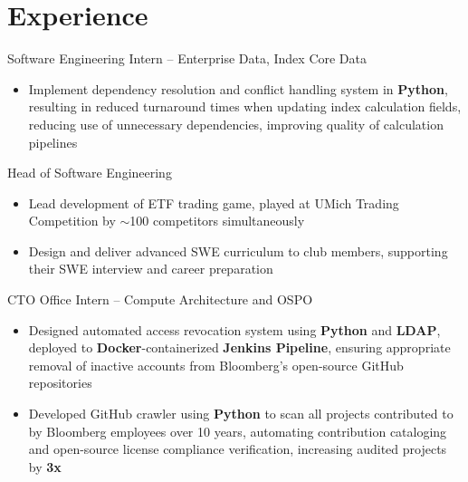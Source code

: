 \documentclass[letterpaper,11pt]{article}
\begin{document}
\section{Experience}
{Software Engineering Intern -- Enterprise Data, Index Core Data}{}
\begin{itemize}
    \item Implement dependency resolution and conflict handling system in
        \textbf{Python}, resulting in reduced turnaround times when
        updating index calculation fields, reducing use of unnecessary
        dependencies, improving quality of calculation pipelines
\end{itemize}
{Head of Software Engineering}{}
\begin{itemize}
    \item Lead development of ETF trading game, played at UMich Trading Competition
        by $\sim$100 competitors simultaneously
    \item Design and deliver advanced SWE curriculum to club members, supporting
        their SWE interview and career preparation
\end{itemize}
{CTO Office Intern -- Compute Architecture and OSPO}{}
\begin{itemize}
    \item Designed automated access revocation system using \textbf{Python} and
        \textbf{LDAP}, deployed to \textbf{Docker}-containerized
        \textbf{Jenkins Pipeline}, ensuring appropriate removal of inactive
        accounts from Bloomberg's open-source GitHub repositories
    \item Developed GitHub crawler using \textbf{Python} to scan all projects
        contributed to by Bloomberg employees over 10 years, automating
        contribution cataloging and open-source license compliance
        verification, increasing audited projects by \textbf{3x}
\end{itemize}
\end{document}
